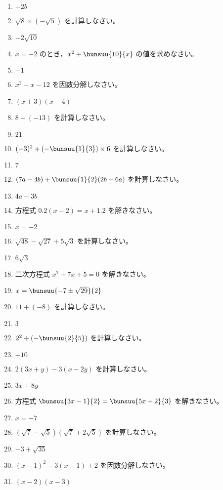 \documentclass[uplatex,a4j,11pt]{jsreport}
\begin{document}
\begin{multicols}{2}
\begin{enumerate}
    \item $-2b$
    \item $\sqrt{8}\times (-\sqrt{5})$ を計算しなさい。%
    \item $-2\sqrt{10}$
    \item $x=-2$ のとき，$x^2+\bunsuu{10}{x}$ の値を求めなさい。%
    \item $-1$
    \item $x^2-x-12$ を因数分解しなさい。%
    \item $(x+3)(x-4)$
    \item $8-(-13)$ を計算しなさい。%
    \item $21$
    \item $(-3)^2+\left(-\bunsuu{1}{3}\right)\times6$ を計算しなさい。%
    \item $7$
    \item $(7a-4b)+\bunsuu{1}{2}(2b-6a)$ を計算しなさい。%
    \item $4a-3b$
    \item 方程式 $0.2(x-2)=x+1.2$ を解きなさい。%
    \item $x = -2$
    \item $\sqrt{48}-\sqrt{27}+5\sqrt{3}$ を計算しなさい。%
    \item $6\sqrt{3}$
    \item 二次方程式 $x^2+7x+5=0$ を解きなさい。%
    \item $x=\bunsuu{-7\pm\sqrt{29}}{2}$
    \item $11+(-8)$ を計算しなさい。%
    \item $3$
    \item $2^2\div \left(-\bunsuu{2}{5}\right)$ を計算しなさい。%
    \item $-10$
    \item $2(3x+y)-3(x-2y)$ を計算しなさい。%
    \item $3x+8y$
    \item 方程式 $\bunsuu{3x-1}{2}=\bunsuu{5x+2}{3}$ を解きなさい。%
    \item $x=-7$
    \item $(\sqrt{7}-\sqrt{5})(\sqrt{7}+2\sqrt{5})$ を計算しなさい。%
    \item $-3+\sqrt{35}$
    \item $(x-1)^2-3(x-1)+2$ を因数分解しなさい。%
    \item $(x-2)(x-3)$

\end{enumerate}
\end{multicols}
\end{document}
